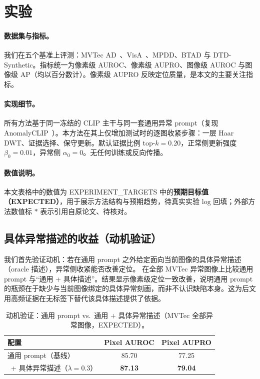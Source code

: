 \section{实验}
\label{sec:exp}


\paragraph{数据集与指标。}
我们在五个基准上评测：MVTec AD~\cite{bergmann2019mvtec}、VisA~\cite{zou2022visa}、MPDD、BTAD 与 DTD-Synthetic。指标统一为像素级 AUROC、像素级 AUPRO、图像级 AUROC 与图像级 AP（均以百分数计）。像素级 AUPRO 反映定位质量，是本文的主要关注指标。

\paragraph{实现细节。}
所有方法基于同一冻结的 CLIP 主干与同一套通用异常 prompt（复现 AnomalyCLIP~\cite{zhou2024anomalyclip}）。本方法在其上仅增加测试时的逐图收紧步骤：一层 Haar DWT、证据选择、保守更新。默认证据比例 top-$k=0.20$，正常侧更新强度 $\beta_0=0.01$，异常侧 $\alpha_0=0$。无任何训练或反向传播。

\paragraph{数值说明。}
本文表格中的数值为 EXPERIMENT\_TARGETS 中的\textbf{预期目标值（EXPECTED）}，用于展示方法结构与预期趋势，待真实实验 log 回填；外部方法数值标 $*$ 表示引用自原论文、待核对。

\subsection{具体异常描述的收益（动机验证）}
我们首先验证动机：若在通用 prompt 之外给定面向当前图像的具体异常描述（oracle 描述），异常侧收紧能否改善定位。 在全部 MVTec 异常图像上比较通用 prompt 与“通用 + 具体描述”。结果显示像素级定位一致改善，说明通用 prompt 的瓶颈在于缺少与当前图像绑定的具体异常刻画，而非不认识缺陷本身。这为后文用高频证据在无标签下替代该具体描述提供了依据。

\begin{table}[t]\centering
\caption{动机验证：通用 prompt vs.\ 通用 + 具体异常描述（MVTec 全部异常图像，EXPECTED）。}
\label{tab:oracle}
\begin{tabular}{lcc}
\toprule
配置 & Pixel AUROC & Pixel AUPRO \\
\midrule
通用 prompt（基线）        & 85.70 & 77.25 \\
\ + 具体异常描述（$\lambda{=}0.3$） & \textbf{87.13} & \textbf{79.04} \\
\bottomrule
\end{tabular}
\end{table}

